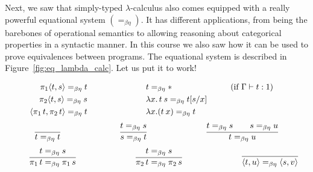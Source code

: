 \documentclass[a4paper, 11pt]{article}
\theoremstyle{definition}
\begin{document}
Next, we saw that simply-typed $\lambda$-calculus also comes equipped with a
really powerful equational system $(=_{\beta \eta})$. It has different
applications, from being the barebones of operational semantics to allowing
reasoning about categorical properties in a syntactic manner.  In this course
we also saw how it can be used to prove equivalences between programs.  The
equational system is described in Figure~\ref{fig:eq_lambda_calc}. Let us put
it to work!

\begin{figure}[h]
\begin{minipage}{1\textwidth}
        \begin{align*}
                \pi_1 \langle t, s \rangle =_{\beta \eta} t
                \hspace{2.5cm}
                &
                t =_{\beta \eta} \ast \hspace{2.5cm} (\text{if } \Gamma \vdash t : 1) 
                \hspace{2.5cm}
                \\
                \pi_2 \langle t, s \rangle =_{\beta \eta} s 
                \hspace{2.5cm}
                &
                \lambda x. \, t \> s =_{\beta \eta} t[s/x] 
                \\
                \langle  \pi_1 \, t,  \pi_2 \, t  \rangle =_{\beta \eta} t
                \hspace{2.5cm}
                &
                \lambda x.  (t \> x) =_{\beta \eta} t
        \end{align*}
        \noindent\dotfill{}
        \begin{align*}
                \infer{t =_{\beta \eta} t}{}
                \hspace{2.5cm}
                \infer{s =_{\beta \eta} t}{t =_{\beta \eta} s}
                \hspace{2.5cm}
                \infer{t =_{\beta \eta} u}
                {
                        t =_{\beta \eta} s \qquad
                        s =_{\beta \eta} u
                }
        \end{align*}
        \begin{align*}
          \infer{\pi_1 \, t =_{\beta \eta} \pi_1 \, s}{
          t =_{\beta \eta} s} 
        \hspace{2.5cm}
          \infer{\pi_2 \, t =_{\beta \eta} \pi_2\, s}{
          t =_{\beta \eta} s} 
        \hspace{2.5cm}
        \infer{ \pv{t}{u} =_{\beta \eta} \pv{s}{v} }{
}
\end{align*}
\end{minipage}
\end{figure}
\end{document}
